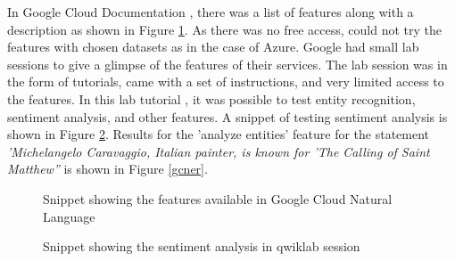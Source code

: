 In Google Cloud Documentation \cite{gcdocs2}, there was a list of features along with a description as shown in Figure \ref{gcfeatures}. As there was no free access, could not try the features with chosen datasets as in the case of Azure. Google had small lab sessions to give a glimpse of the features of their services. The lab session was in the form of tutorials, came with a set of instructions, and very limited access to the features. In this lab tutorial \cite{gcqwiklab}, it was possible to test entity recognition, sentiment analysis, and other features. A snippet of testing sentiment analysis is shown in Figure \ref{gcsenti}. Results for the 'analyze entities' feature for the statement \textit{'Michelangelo Caravaggio, Italian painter, is known for 'The Calling of Saint Matthew''} is shown in Figure \ref{gcner}.
\begin {figure}[h!h]
    \centering
    \caption{Snippet showing the features available in Google Cloud Natural Language}
    \label{gcfeatures}
\end {figure}
\begin {figure}[h!h]
    \centering
    \caption{Snippet showing the sentiment analysis in qwiklab session}
    \label{gcsenti}
\end {figure}
